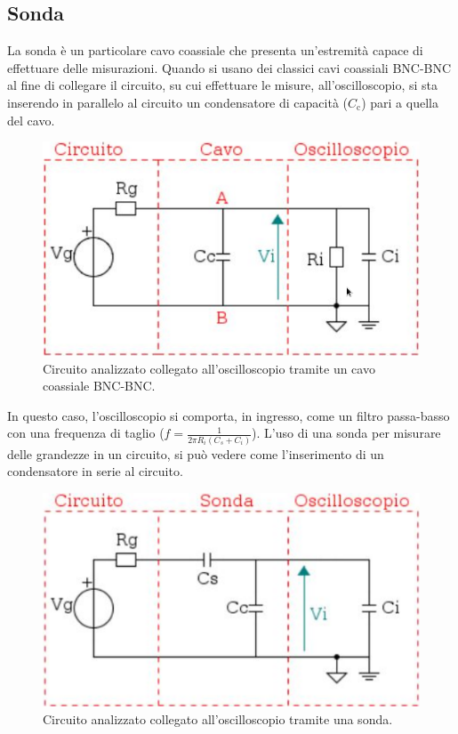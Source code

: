 \documentclass[a4paper]{article}
\begin{document}
		\subsection{Sonda}
			La sonda è un particolare cavo coassiale che presenta un'estremità capace di effettuare delle misurazioni.
			\newline
			Quando si usano dei classici cavi coassiali BNC-BNC al fine di collegare il circuito, su cui effettuare le misure, all'oscilloscopio, si sta inserendo in parallelo al circuito un condensatore di capacità ($ C_{\mathrm{c}} $) pari a quella del cavo.
			\begin{figure}[h!]
				\centering
				\includegraphics[scale=0.4]{theveninCavoDSO}
				\caption{Circuito analizzato collegato all'oscilloscopio tramite un cavo coassiale BNC-BNC.}
				\label{fig:theveninCavoDSO}
			\end{figure}
			\newpage
			In questo caso, l’oscilloscopio si comporta, in ingresso, come un filtro passa-basso con una frequenza di taglio ($ f = \frac{1}{2\pi R_{i} (C_{s} + C_{i})} $). L'uso di una sonda per misurare delle grandezze in un circuito, si può vedere come l'inserimento di un condensatore in serie al circuito.
			\begin{figure}[h!]
				\centering
				\includegraphics[scale=0.4]{theveninSondaDSOCircuito}
				\caption{Circuito analizzato collegato all'oscilloscopio tramite una sonda.}
				\label{fig:theveninSondaDSOCircuito}
			\end{figure}
\end{document}
